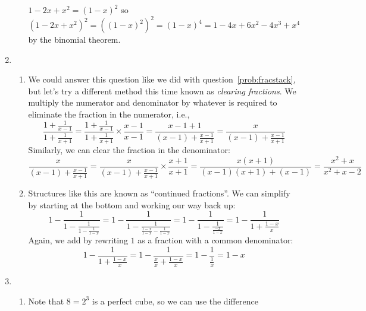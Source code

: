 \documentclass{article}
\begin{document}
\begin{enumerate}
\begin{enumerate}
    $1-2x+x^2=(1-x)^2$ so 
    \begin{equation*}
      (1-2x+x^2)^2 = ((1-x)^2)^2 = (1-x)^4
      = 1-4x+6x^2-4x^3+x^4
    \end{equation*}
    by the binomial theorem.
  \end{enumerate}
\item %
  \begin{enumerate}
  \item We could answer this question like we did with 
    question~\ref{prob:fracstack}, but let's try a different method this
    time known as \textit{clearing fractions}.  We multiply the numerator
    and denominator by whatever is required to eliminate the fraction in
    the numerator, i.e.,
    \begin{equation*}
      \frac{1+\frac{1}{x-1}}{1+\frac{1}{x+1}}
      = \frac{1+\frac{1}{x-1}}{1+\frac{1}{x+1}} \times
      \frac{x-1}{x-1}
      = \frac{x-1+1}{(x-1)+\frac{x-1}{x+1}}
      = \frac{x}{(x-1)+\frac{x-1}{x+1}}
    \end{equation*}
    Similarly, we can clear the fraction in the denominator:
    \begin{equation*}
      \frac{x}{(x-1)+\frac{x-1}{x+1}}
      = \frac{x}{(x-1)+\frac{x-1}{x+1}} \times \frac{x+1}{x+1}
      = \frac{x(x+1)}{(x-1)(x+1) +(x-1)}
      = \frac{x^2+x}{x^2+x-2}
    \end{equation*}
  \item Structures like this are known as ``continued fractions''.
    We can simplify by starting at the bottom and working our way back
    up:
    \begin{equation*}
      1-\frac{1}{1-\frac{1}{1-\frac{1}{1-x}}}
      = 1-\frac{1}{1-\frac{1}{\frac{1-x}{1-x}-\frac{1}{1-x}}}
      = 1-\frac{1}{1-\frac{1}{\frac{-x}{1-x}}}
      = 1-\frac{1}{1+\frac{1-x}{x}}
    \end{equation*}
    Again, we add by rewriting $1$ as a fraction with a common denominator:
    \begin{equation*}
      1-\frac{1}{1+\frac{1-x}{x}}
      = 1 - \frac{1}{\frac{x}{x}+\frac{1-x}{x}}
      = 1 - \frac{1}{\frac{1}{x}}
      = 1-x
    \end{equation*}
  \end{enumerate}
\item %
  \begin{enumerate}
  \item %
    Note that $8=2^3$ is a perfect cube, so we can use the difference

\end{enumerate}
\end{enumerate}
\end{document}
